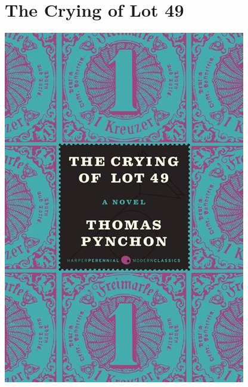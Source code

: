 \documentclass{tufte-handout}
\makeatletter
\newcommand{\varcaption}[2][0pt]{%
  \gsetlength{\@tufte@caption@vertical@offset}{-#1}%
  \gdef\@tufte@stored@varcaption{#2}%
}
\gdef\@tufte@stored@varcaption{} %
\makeatother
\begin{document}
\section*{The Crying of Lot 49}
\begin{marginfigure}[17\baselineskip]
   \includegraphics[width=\linewidth]{images/crying_of_lot_49.jpg}
   \varcaption{\href{https://www.harpercollins.com/9780062334411/the-crying-of-lot-49/}{Publisher Link}, \href{https://www.amazon.com/Crying-Lot-Perennial-Fiction-Library/dp/006091307X}{Amazon Link}}
\end{marginfigure}
\end{document}
